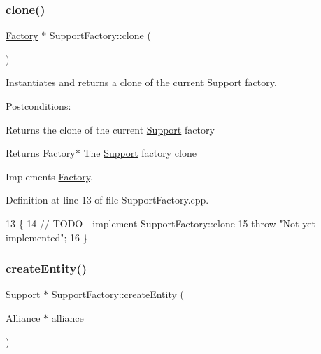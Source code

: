 \subsubsection{\texorpdfstring{clone()}{clone()}}
{\footnotesize\ttfamily \hyperlink{classFactory}{Factory} $\ast$ Support\+Factory\+::clone (\begin{DoxyParamCaption}{ }\end{DoxyParamCaption})\hspace{0.3cm}{\ttfamily [virtual]}}



Instantiates and returns a clone of the current \hyperlink{classSupport}{Support} factory. 

Postconditions\+:
\begin{DoxyItemize}
\item Returns the clone of the current \hyperlink{classSupport}{Support} factory
\end{DoxyItemize}

\begin{DoxyReturn}{Returns}
Factory$\ast$ The \hyperlink{classSupport}{Support} factory clone 
\end{DoxyReturn}


Implements \hyperlink{classFactory_a00881ec5050751e4b747db5dfd266192}{Factory}.



Definition at line 13 of file Support\+Factory.\+cpp.


\begin{DoxyCode}
13                                \{
14     \textcolor{comment}{// TODO - implement SupportFactory::clone}
15     \textcolor{keywordflow}{throw} \textcolor{stringliteral}{"Not yet implemented"};
16 \}
\end{DoxyCode}
\mbox{\label{classSupportFactory_ae78e2f65e24d2ae2f73032bc465b879b}} 
\subsubsection{\texorpdfstring{create\+Entity()}{createEntity()}}
{\footnotesize\ttfamily \hyperlink{classSupport}{Support} $\ast$ Support\+Factory\+::create\+Entity (\begin{DoxyParamCaption}\item[{\hyperlink{classAlliance}{Alliance} $\ast$}]{alliance }\end{DoxyParamCaption})\hspace{0.3cm}{\ttfamily [virtual]}}



